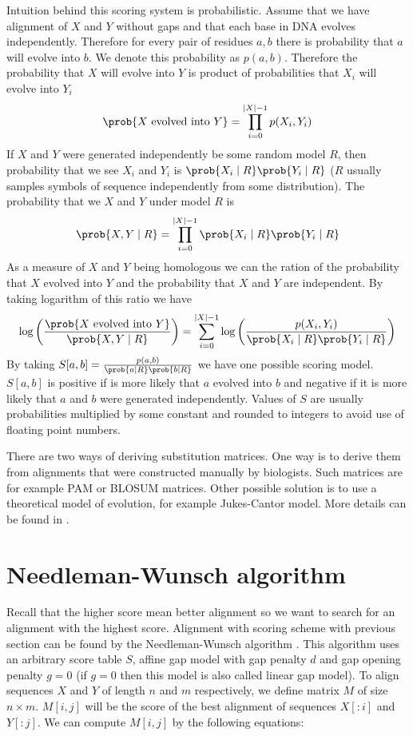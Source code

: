 Intuition behind this scoring system is probabilistic. Assume that we have
alignment of $X$ and $Y$ without gaps and that each base in DNA evolves
independently. Therefore for every pair of residues $a,b$ there is probability
that $a$ will evolve into $b$. We denote this probability as $p(a,b)$. Therefore the probability that $X$ will evolve
into $Y$ is product of probabilities that $X_i$ will evolve into $Y_i$
\[
\prob{X\text{ evolved into }Y} = \prod_{i=0}^{|X|-1}p(X_i,Y_i)
\]
If $X$ and $Y$ were generated independently be some random model $R$, then probability that we see $X_i$
and $Y_i$ is $\prob{X_i\mid R}\prob{Y_i\mid R}$ ($R$ usually samples symbols
of sequence independently from some distribution). The probability that we $X$
and $Y$ under model $R$ is
\[
\prob{X,Y\mid R} = \prod_{i=0}^{|X|-1}\prob{X_i\mid R}\prob{Y_i\mid R}
\]
As a measure of  $X$ and $Y$ being homologous we can the ration of the
probability that $X$ evolved into $Y$ and the probability that $X$ and $Y$ are
independent.
By taking logarithm of this ratio we have
\[
\log\left(
\frac{\prob{X\text{ evolved into }Y}}{\prob{X,Y\mid R} }\right)
= \sum_{i=0}^{|X|-1}\log\left(\frac{p(X_i,Y_i)}{\prob{X_i\mid R}\prob{Y_i\mid
R}}
\right)
\]
By taking $S[a,b]=\frac{p(a,b)}{\prob{a\mid R}\prob{b\mid R}}$ we have one
possible scoring model. $S[a,b]$ is positive if is more likely that $a$ evolved
into $b$ and negative if it is more likely that $a$ and $b$ were generated
independently.  Values of $S$ are usually probabilities multiplied by some
constant and rounded to integers to avoid use of floating point numbers. 

There are two ways of deriving substitution matrices. One way is to derive them
from alignments that were constructed manually by biologists. Such matrices are
for example PAM or BLOSUM matrices. Other possible solution is to use a
theoretical model of evolution, for example Jukes-Cantor model. More details can
be found in \cite{Durbin1998}.



\section{Needleman-Wunsch algorithm}
\label{SECTION:NEEDLE}


Recall that the higher score mean better alignment so we want to search for an
alignment with the highest score.  Alignment with scoring scheme with previous
section can be found by the Needleman-Wunsch algorithm \cite{Durbin1998}.
This algorithm uses an arbitrary score table $S$, affine gap model with gap penalty
$d$ and gap opening penalty $g=0$ (if $g=0$ then this model is also called
linear gap model). To align sequences $X$ and $Y$ of length $n$ and $m$
respectively, we define matrix $M$ of size $n\times m$. $M[i,j]$ will be the
score of the best alignment of sequences $X[:i]$ and $Y[:j]$. We can compute
$M[i,j]$ by the following equations:

